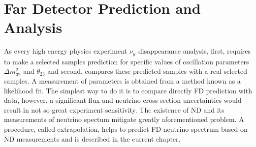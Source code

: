\chapter{Far Detector Prediction and Analysis}
\label{prediction_chapter}

As every high energy physics experiment $\nu_\mu$ disappearance analysis, first, requires to make
a selected samples prediction for specific values of oscillation parameters $\Delta m^2_{32}$ and 
$\theta_{23}$ and second, compares these predicted samples with a real selected samples. A measurement 
of parameters is obtained from a method known as a likelihood fit. The simplest way to do it is to 
compare directly FD prediction with data, however, a significant flux and neutrino cross section
uncertainties would result in not so great experiment sensitivity. The existence of ND and its measurements
of neutrino spectum mitigate greatly aforementioned problem. A procedure, called extrapolation, 
helps to predict FD neutrino spectrum based on ND measurements and is described in the current chapter.


